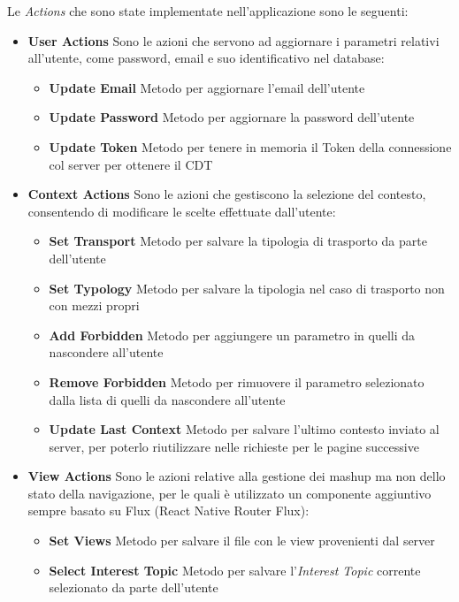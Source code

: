 Le \emph{Actions} che sono state implementate nell'applicazione sono le seguenti:

\begin{itemize}
	\item \textbf{User Actions}
	Sono le azioni che servono ad aggiornare i parametri relativi all'utente, come password, email e suo identificativo nel database:
	\begin{itemize}
		\item \textbf{Update Email}
		Metodo per aggiornare l'email dell'utente 
		\item \textbf{Update Password}
		Metodo per aggiornare la password dell'utente
		\item \textbf{Update Token}
		Metodo per tenere in memoria il Token della connessione col server per ottenere il CDT
	\end{itemize}
	\item \textbf{Context Actions}
	Sono le azioni che gestiscono la selezione del contesto, consentendo di modificare le scelte effettuate dall'utente:
	\begin{itemize}
		\item \textbf{Set Transport}
		Metodo per salvare la tipologia di trasporto da parte dell'utente
		\item \textbf{Set Typology}
		Metodo per salvare la tipologia nel caso di trasporto non con mezzi propri
		\item \textbf{Add Forbidden}
		Metodo per aggiungere un parametro in quelli da nascondere all'utente
		\item \textbf{Remove Forbidden}
		Metodo per rimuovere il parametro selezionato dalla lista di quelli da nascondere all'utente
		\item \textbf{Update Last Context}
		Metodo per salvare l'ultimo contesto inviato al server, per poterlo riutilizzare nelle richieste per le pagine successive
	\end{itemize}
	\item \textbf{View Actions}
	Sono le azioni relative alla gestione dei mashup ma non dello stato della navigazione, per le quali è utilizzato un componente aggiuntivo sempre basato su Flux (React Native Router Flux):
	\begin{itemize}
		\item \textbf{Set Views}
		Metodo per salvare il file con le view provenienti dal server 
		\item \textbf{Select Interest Topic}
		Metodo per salvare l'\emph{Interest Topic} corrente selezionato da parte dell'utente

\end{itemize}
\end{itemize}
